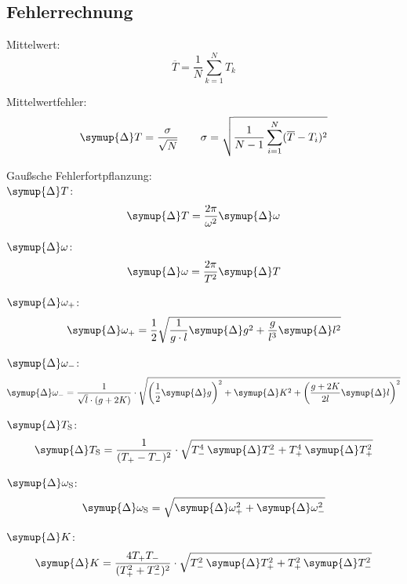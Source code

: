 


\subsection{Fehlerrechnung}    
\label{subsec:Fehler}
Mittelwert:
\begin{equation}
    \label{eqn:Mittelwert}
    \overline{T} = \frac{1}{N}\sum_{k = 1}^N T_k
\end{equation}

Mittelwertfehler:
\begin{gather}
    \label{eqn:MWFehler}
    \symup{\Delta} T = \frac{\sigma}{\sqrt{N}} \qquad \sigma = \sqrt{\frac{1}{N-1}\sum_{i = 1}^N (\overline{T}-T_i)^2}
\end{gather}

Gaußsche Fehlerfortpflanzung: \\    
$\symup{\Delta}T$:
\begin{equation}
    \label{eqn:DeltaT}
    \symup{\Delta}T = \frac{2\pi}{\omega^2}\symup{\Delta}\omega
\end{equation}

$\symup{\Delta}\omega$:
\begin{equation}
    \label{eqn:DeltaOmega}
    \symup{\Delta}\omega = \frac{2\pi}{T^2}\symup{\Delta}T
\end{equation}

$\symup{\Delta}\omega_+$:
\begin{equation}
    \label{eqn:DeltaOmegaPlus}
    \symup{\Delta}\omega_+ = \frac{1}{2} \sqrt{\frac{1}{g \cdot l} \symup{\Delta}g^2 + \frac{g}{l^3}\symup{\Delta}l^2}
\end{equation}

$\symup{\Delta}\omega_-$:
\begin{equation}
    \label{eqn:DeltaOmegaMinus}
    \symup{\Delta}\omega_- = \frac{1}{\sqrt{l} \cdot (g + 2K)} \cdot \sqrt{\left(\frac{1}{2}\symup{\Delta}g\right)^2 + \symup{\Delta}K^2 + \left(\frac{g+2K}{2l}\symup{\Delta}l\right)^2}
\end{equation}

$\symup{\Delta}T_{\text{S}}$:
\begin{equation}
    \label{eqn:DeltaT_s}
    \symup{\Delta}T_{\text{S}} = \frac{1}{(T_+ - T_-)^2} \cdot \sqrt{T_-^4 \, \symup{\Delta}T_-^2 + T_+^4 \, \symup{\Delta}T_+^2}
\end{equation}

$\symup{\Delta}\omega_{\text{S}}$:
\begin{equation}
    \label{eqn:DeltaOmega_s}
    \symup{\Delta}\omega_{\text{S}} = \sqrt{\symup{\Delta}\omega_+^2 + \symup{\Delta}\omega_-^2}
\end{equation}

$\symup{\Delta}K$:
\begin{equation}
    \label{eqn:DeltaK}
    \symup{\Delta}K = \frac{4T_+T_-}{(T_+^2 + T_-^2)^2} \cdot \sqrt{T_-^2 \, \symup{\Delta}T_+^2 + T_+^2 \, \symup{\Delta}T_-^2}
\end{equation}
